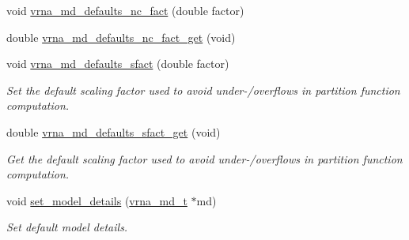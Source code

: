 \begin{DoxyCompactItemize}
void \mbox{\hyperlink{group__model__details_gac35e596c850dce3ad55c49119fd7d471}{vrna\+\_\+md\+\_\+defaults\+\_\+nc\+\_\+fact}} (double factor)
\item 
double \mbox{\hyperlink{group__model__details_ga7ac759eaa7159bf5f022745f5da59508}{vrna\+\_\+md\+\_\+defaults\+\_\+nc\+\_\+fact\+\_\+get}} (void)
\item 
void \mbox{\hyperlink{group__model__details_ga3f73d3029d3d0025d4cc311510cd95a3}{vrna\+\_\+md\+\_\+defaults\+\_\+sfact}} (double factor)
\begin{DoxyCompactList}\small\item\em Set the default scaling factor used to avoid under-\//overflows in partition function computation. \end{DoxyCompactList}\item 
double \mbox{\hyperlink{group__model__details_gab2df6aab954b63fd3592d18e90285dae}{vrna\+\_\+md\+\_\+defaults\+\_\+sfact\+\_\+get}} (void)
\begin{DoxyCompactList}\small\item\em Get the default scaling factor used to avoid under-\//overflows in partition function computation. \end{DoxyCompactList}\item 
void \mbox{\hyperlink{group__model__details_gabad896c3650d420f3f3ddefc69e2bceb}{set\+\_\+model\+\_\+details}} (\mbox{\hyperlink{group__model__details_ga1f8a10e12a0a1915f2a4eff0b28ea17c}{vrna\+\_\+md\+\_\+t}} $\ast$md)
\begin{DoxyCompactList}\small\item\em Set default model details. \end{DoxyCompactList}\end{DoxyCompactItemize}
